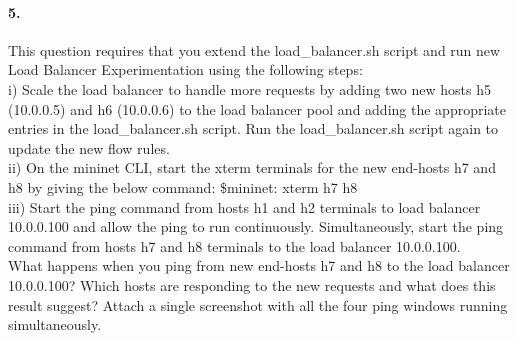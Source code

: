 \documentclass[a4paper]{article}
\begin{document}
\paragraph{5. } This question requires that you extend the load\_balancer.sh script and run new Load Balancer Experimentation using the following steps: \\

i) Scale the load balancer to handle more requests by adding two new hosts h5 (10.0.0.5) and h6 (10.0.0.6) to the load balancer pool and adding the appropriate entries in the load\_balancer.sh script. Run the load\_balancer.sh script again to update the new flow rules. \\

ii) On the mininet CLI, start the xterm terminals for the new end-hosts h7 and h8 by giving the below command: \$mininet: xterm h7 h8 \\

iii) Start the ping command from hosts h1 and h2 terminals to load balancer 10.0.0.100 and allow the ping to run continuously. Simultaneously, start the ping command from hosts h7 and h8 terminals to the load balancer 10.0.0.100. \\

What happens when you ping from new end-hosts h7 and h8 to the load balancer 10.0.0.100? Which hosts are responding to the new requests and what does this result suggest? Attach a single screenshot with all the four ping windows running simultaneously.
\end{document}
